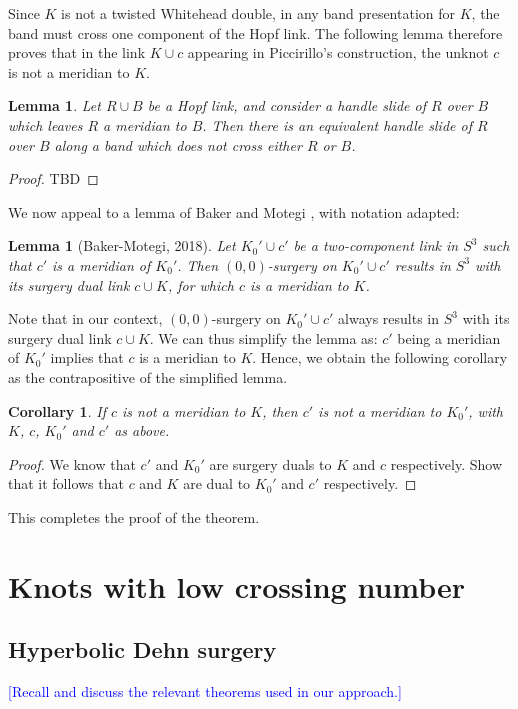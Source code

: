 \documentclass[11pt,usenames,dvipsnames,reqno]{amsart}
\numberwithin{theorem}{section}
\newtheorem{corollary}[theorem]{Corollary}
\newtheorem{lemma}[theorem]{Lemma}
\theoremstyle{ex}
\theoremstyle{rem}
\def\kh#1{\textcolor{Blue}{#1}}
\begin{document}
Since $K$ is not a twisted Whitehead double, in any band presentation for $K$, the band must cross one component of the Hopf link. The following lemma therefore proves that in the link $K\cup c$ appearing in Piccirillo's construction, the unknot $c$ is not a meridian to $K$.

\begin{lemma}
	Let $R\cup B$ be a Hopf link, and consider a handle slide of $R$ over $B$ which leaves $R$ a meridian to $B$. Then there is an equivalent handle slide of $R$ over $B$ along a band which does not cross either $R$ or $B$.
\end{lemma}
\begin{proof}
	TBD
\end{proof}

We now appeal to a lemma of Baker and Motegi \cite[Lemma 2.4]{baker-motegi}, with notation adapted:

\begin{lemma}[Baker-Motegi, 2018]
	Let $K_0'\cup c'$ be a two-component link in $S^3$ such that $c'$ is a meridian of $K_0'$. Then $(0,0)$-surgery on $K_0'\cup c'$ results in $S^3$ with its surgery dual link $c\cup K$, for which $c$ is a meridian to $K$.
\end{lemma}

Note that in our context, $(0,0)$-surgery on $K_0'\cup c'$ always results in $S^3$ with its surgery dual link $c\cup K$. We can thus simplify the lemma as: $c'$ being a meridian of $K_0'$ implies that $c$ is a meridian to $K$. Hence, we obtain the following corollary as the contrapositive of the simplified lemma. 

\begin{corollary}
	If $c$ is not a meridian to $K$, then $c'$ is not a meridian to $K_0'$, with $K$, $c$, $K_0'$ and $c'$ as above. 
\end{corollary}

\begin{proof}
	We know that $c'$ and $K_0'$ are surgery duals to $K$ and $c$ respectively. Show that it follows that $c$ and $K$ are dual to $K_0'$ and $c'$ respectively.
\end{proof}
This completes the proof of the theorem.

\section{Knots with low crossing number}

\subsection{Hyperbolic Dehn surgery} \kh{[Recall and discuss the relevant theorems used in our approach.]}
\end{document}

